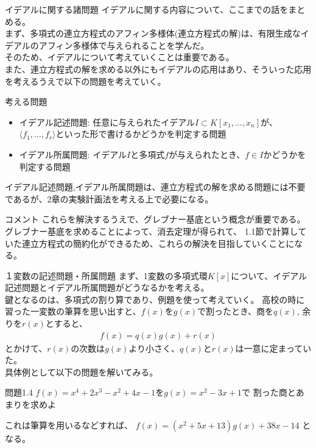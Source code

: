 \begin{frame} {イデアルに関する諸問題}
	イデアルに関する内容について、ここまでの話をまとめる。\\
	まず、多項式の連立方程式のアフィン多様体(連立方程式の解)は、有限生成なイデアルのアフィン多様体で与えられることを学んだ。\\
	そのため、イデアルについて考えていくことは重要である。\\
	また、連立方程式の解を求める以外にもイデアルの応用はあり、そういった応用を考えるうえで以下の問題を考えていく。
	\begin{block} {考える問題}
		\begin{itemize}
			\item イデアル記述問題: 任意に与えられたイデアル$I \subset K[x_1,\ldots,x_n]$が、$\langle f_1, \ldots, f_r \rangle$といった形で書けるかどうかを判定する問題
			\item イデアル所属問題: イデアル$I$と多項式$f$が与えられたとき、$f \in I$かどうかを判定する問題
		\end{itemize}
	\end{block}
	イデアル記述問題,イデアル所属問題は、連立方程式の解を求める問題には不要であるが、2章の実験計画法を考える上で必要になる。 \\

\end{frame}

\begin{frame}
	\begin{block} {コメント}
		これらを解決するうえで、グレブナー基底という概念が重要である。
		グレブナー基底を求めることによって、消去定理が得られて、
		1.1節で計算していた連立方程式の簡約化ができるため、これらの解決を目指していくことになる。
	\end{block}
\end{frame}

\begin{frame} {１変数の記述問題・所属問題}
	まず、1変数の多項式環$K[x]$について、イデアル記述問題とイデアル所属問題がどうなるかを考える。\\
	鍵となるのは、多項式の割り算であり、例題を使って考えていく。
	高校の時に習った一変数の筆算を思い出すと、$f(x)$を$g(x)$で割ったとき、商を$q(x)$, 余りを$r(x)$とすると、
	\begin{align*}
		f(x) = q(x) g(x) + r(x)
	\end{align*}
	とかけて、$r(x)$の次数は$g(x)$より小さく、$q(x)$と$r(x)$は一意に定まっていた。\\
	具体例として以下の問題を解いてみる。
	\begin{exampleblock} {問題1.4}
		$f(x) = x^4 + 2x^3 - x^2 + 4x - 1$を$g(x) = x^2 - 3x + 1$で
		割った商とあまりを求めよ
	\end{exampleblock}
	これは筆算を用いるなどすれば、
	$f(x) = (x^2 + 5x + 13) g(x) + 38x - 14$
	となる。
\end{frame}

